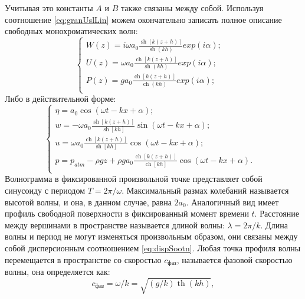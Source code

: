 Учитывая это константы $A$ и $B$ также связаны между собой. Используя соотношение \eqref{eq:granUslLin} можем окончательно записать полное описание свободных монохроматических волн:
\begin{equation}\label{eq:solveBorderTask1}
  \begin{cases}
  W(z)=i\omega a_0\frac{\operatorname{sh}[k(z+h)]}{\operatorname{sh}(kh)}exp(i\alpha); & \\
  U(z)=\omega a_0\frac{\operatorname{ch}[k(z+h)]}{\operatorname{sh}(kh)}exp(i\alpha); & \\
  P(z)=g a_0\frac{\operatorname{ch}[k(z+h)]}{\operatorname{ch}(kh)}exp(i\alpha); & \\
  \end{cases}
\end{equation}
Либо в действительной форме:
\begin{equation}\label{eq:solveBorderTask1}
  \begin{cases}
  \eta=a_0\operatorname{cos}(\omega t-kx+\alpha); & \\
  w = -\omega a_0\frac{\operatorname{sh}[k(z+h)]}{\operatorname{sh}[kh]}\operatorname{sin}(\omega t - kx+\alpha); & \\
  u = \omega a_0\frac{\operatorname{ch}[k(z+h)]}{\operatorname{sh}[kh]}\operatorname{cos}(\omega t - kx+\alpha); & \\
  p = p_{atm}-\rho gz+\rho ga_0\frac{\operatorname{ch}[k(z+h)]}{\operatorname{ch}[kh]}\operatorname{cos}(\omega t - kx+\alpha). & \\
  \end{cases}
\end{equation}
Волнограмма в фиксированной произвольной точке представляет собой синусоиду с периодом $T=2\pi/\omega$. Максимальный размах колебаний называется высотой волны, и она, в данном случае, равна $2a_0$. Аналогичный вид имеет профиль свободной поверхности в фиксированный момент времени $t$. Расстояние между вершинами в пространстве называется длиной волны: $\lambda=2\pi/k$. Длина волны и период не могут изменяться произвольным образом, они связаны между собой дисперсионным соотношением \eqref{eq:dispSootn}. Любая точка профиля волны перемещается в пространстве со скоростью $c_{\text{фаз}}$, называется фазовой скоростью волны, она определяется как:
\begin{equation}\label{eq:fazSpeed}
  c_{\text{фаз}}=\omega/k=\sqrt{(g/k)\operatorname{th}(kh)},
\end{equation}

